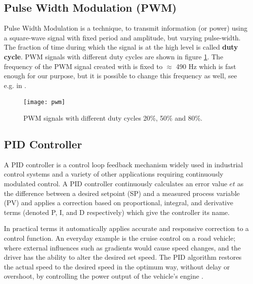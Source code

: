 \subsection{Pulse Width Modulation (PWM)}

Pulse Width Modulation is a technique, to transmit information (or power) using a square-wave signal with fixed period and amplitude, but varying pulse-width. The fraction of time during which the signal is at the high level is called \textbf{duty cycle}. PWM signals with different duty cycles are shown in figure \ref{fig:pwm}. The frequency of the PWM signal created with  is fixed to $\approx$ 490 Hz which is fast enough for our purpose, but it is possible to change this frequency as well, see e.g. in \cite{avrguide}.

\begin{figure}[H]
\begin{center}
\texttt{[image: pwm]}
\caption{PWM signals with different duty cycles 20\%, 50\% and 80\%.}\label{fig:pwm}
\end{center}
\end{figure}


\subsection{PID Controller}\label{sec:pid}
A \ac{PID} controller is a control loop feedback mechanism widely used in industrial control systems and a variety of other applications requiring continuously modulated control. A \ac{PID} controller continuously calculates an error value $e{t}$ as the difference between a desired setpoint (SP) and a measured process variable (PV) and applies a correction based on proportional, integral, and derivative terms (denoted P, I, and D respectively) which give the controller its name.\par
In practical terms it automatically applies accurate and responsive correction to a control function. An everyday example is the cruise control on a road vehicle; where external influences such as gradients would cause speed changes, and the driver has the ability to alter the desired set speed. The PID algorithm restores the actual speed to the desired speed in the optimum way, without delay or overshoot, by controlling the power output of the vehicle's engine \cite{wiki:pid}.




